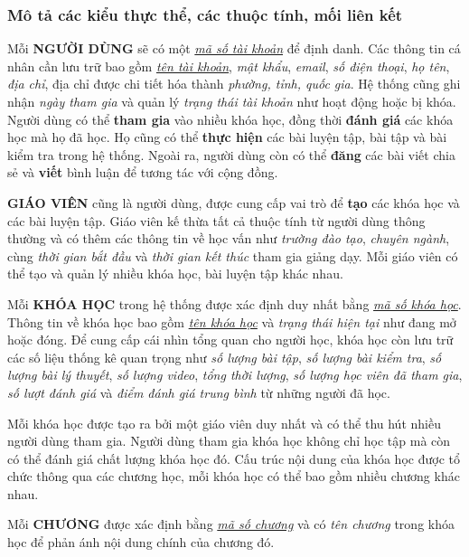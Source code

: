 \subsubsection{Mô tả các kiểu thực thể, các thuộc tính, mối liên kết}
Mỗi \textbf{NGƯỜI DÙNG} sẽ có một \textit{\underline{mã số tài khoản}} để định danh. Các thông tin cá nhân cần lưu trữ bao gồm \underline{\textit{tên tài khoản}}, \textit{mật khẩu}, \textit{email}, \textit{số điện thoại}, \textit{họ tên}, \textit{địa chỉ}, địa chỉ được chi tiết hóa thành \textit{phường, tỉnh, quốc gia}. Hệ thống cũng ghi nhận \textit{ngày tham gia} và quản lý \textit{trạng thái tài khoản} như hoạt động hoặc bị khóa. Người dùng có thể \textbf{tham gia} vào nhiều khóa học, đồng thời \textbf{đánh giá} các khóa học mà họ đã học. Họ cũng có thể \textbf{thực hiện} các bài luyện tập, bài tập và bài kiểm tra trong hệ thống. Ngoài ra, người dùng còn có thể \textbf{đăng} các bài viết chia sẻ và \textbf{viết} bình luận để tương tác với cộng đồng.

\textbf{GIÁO VIÊN} cũng là người dùng, được cung cấp vai trò để \textbf{tạo} các khóa học và các bài luyện tập. Giáo viên kế thừa tất cả thuộc tính từ người dùng thông thường và có thêm các thông tin về học vấn như \textit{trường đào tạo}, \textit{chuyên ngành}, cùng \textit{thời gian bắt đầu} và \textit{thời gian kết thúc} tham gia giảng dạy. Mỗi giáo viên có thể tạo và quản lý nhiều khóa học, bài luyện tập khác nhau.

Mỗi \textbf{KHÓA HỌC} trong hệ thống được xác định duy nhất bằng \underline{\textit{mã số khóa học}}. Thông tin về khóa học bao gồm \underline{\textit{tên khóa học}} và \textit{trạng thái hiện tại} như đang mở hoặc đóng. Để cung cấp cái nhìn tổng quan cho người học, khóa học còn lưu trữ các số liệu thống kê quan trọng như \textit{số lượng bài tập}, \textit{số lượng bài kiểm tra}, \textit{số lượng bài lý thuyết}, \textit{số lượng video}, \textit{tổng thời lượng}, \textit{số lượng học viên đã tham gia}, \textit{số lượt đánh giá} và \textit{điểm đánh giá trung bình} từ những người đã học.

Mỗi khóa học được tạo ra bởi một giáo viên duy nhất và có thể thu hút nhiều người dùng tham gia. Người dùng tham gia khóa học không chỉ học tập mà còn có thể đánh giá chất lượng khóa học đó. Cấu trúc nội dung của khóa học được tổ chức thông qua các chương học, mỗi khóa học có thể bao gồm nhiều chương khác nhau.

Mỗi \textbf{CHƯƠNG} được xác định bằng \underline{\textit{mã số chương}} và có \textit{tên chương} trong khóa học để phản ánh nội dung chính của chương đó.

